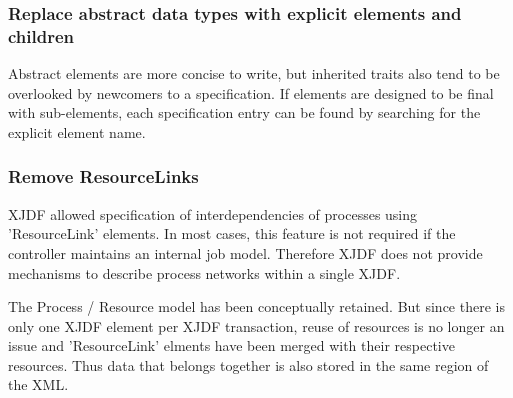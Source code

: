 \subsubsection{Replace abstract data types with explicit elements and children}
Abstract elements are more concise to write, but inherited traits also tend to be overlooked by newcomers to a specification. If elements are designed to be final with sub-elements, each specification entry can be found by searching for the explicit element name.

\subsubsection{Remove ResourceLinks}
XJDF allowed specification of interdependencies of processes using 'ResourceLink' elements. In most cases, this feature is not required if the controller maintains an internal job model. Therefore XJDF does not provide mechanisms to describe process networks within a single XJDF. 

The Process / Resource model has been conceptually retained. But since there is only one XJDF element per XJDF transaction, reuse of resources is no longer an issue and 'ResourceLink' elments have been merged with their respective resources. Thus data that belongs together is also stored in the same region of the XML.